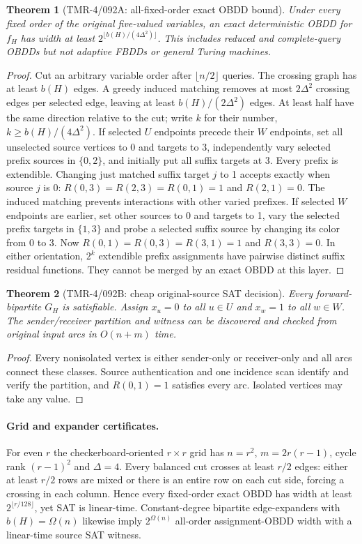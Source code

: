 \documentclass[11pt]{article}
\newtheorem{theorem}{Theorem}
\begin{document}
\begin{theorem}[TMR-4/092A: all-fixed-order exact OBDD bound]
Under every fixed order of the original five-valued variables,
an exact deterministic OBDD for $f_H$ has width
at least $2^{\lfloor b(H)/(4\Delta^2)\rfloor}$.
This includes reduced and complete-query OBDDs but not
adaptive FBDDs or general Turing machines.
\end{theorem}
\begin{proof}
Cut an arbitrary variable order after $\lfloor n/2\rfloor$ queries.
The crossing graph has at least $b(H)$ edges. A greedy
induced matching removes at most $2\Delta^2$ crossing edges
per selected edge, leaving at least $b(H)/(2\Delta^2)$ edges.
At least half have the same direction relative to the cut;
write $k$ for their number, $k\ge b(H)/(4\Delta^2)$.
If selected $U$ endpoints precede their $W$ endpoints,
set all unselected source vertices to 0 and targets to 3,
independently vary selected prefix sources in $\{0,2\}$,
and initially put all suffix targets at 3.
Every prefix is extendible. Changing just matched suffix
target $j$ to 1 accepts exactly when source $j$ is 0:
$R(0,3)=R(2,3)=R(0,1)=1$ and $R(2,1)=0$.
The induced matching prevents interactions with other
varied prefixes. If selected $W$ endpoints are earlier,
set other sources to 0 and targets to 1, vary the
selected prefix targets in $\{1,3\}$ and probe a selected
suffix source by changing its color from 0 to 3.
Now $R(0,1)=R(0,3)=R(3,1)=1$ and $R(3,3)=0$.
In either orientation, $2^k$ extendible prefix assignments
have pairwise distinct suffix residual functions.
They cannot be merged by an exact OBDD at this layer.
\end{proof}

\begin{theorem}[TMR-4/092B: cheap original-source SAT decision]
Every forward-bipartite $G_H$ is satisfiable. Assign
$x_u=0$ to all $u\in U$ and $x_w=1$ to all $w\in W$.
The sender/receiver partition and witness can be discovered
and checked from original input arcs in $O(n+m)$ time.
\end{theorem}
\begin{proof}
Every nonisolated vertex is either sender-only or
receiver-only and all arcs connect these classes.
Source authentication and one incidence scan identify
and verify the partition, and $R(0,1)=1$ satisfies
every arc. Isolated vertices may take any value.
\end{proof}

\paragraph{Grid and expander certificates.}
For even $r$ the checkerboard-oriented $r\times r$ grid
has $n=r^2$, $m=2r(r-1)$, cycle rank $(r-1)^2$ and
$\Delta=4$. Every balanced cut crosses at least $r/2$
edges: either at least $r/2$ rows are mixed or there is
an entire row on each cut side, forcing a crossing in
each column. Hence every fixed-order exact OBDD has width
at least $2^{\lfloor r/128\rfloor}$, yet SAT is linear-time.
Constant-degree bipartite edge-expanders with $b(H)=\Omega(n)$
likewise imply $2^{\Omega(n)}$ all-order assignment-OBDD
width with a linear-time source SAT witness.
\end{document}
